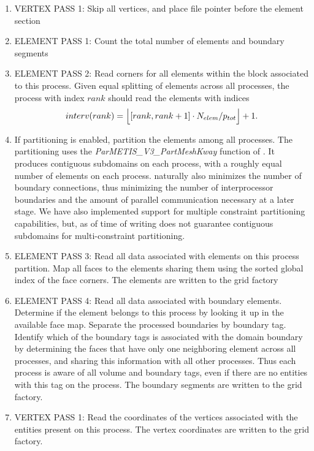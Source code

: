\begin{mybox}
\begin{enumerate}
  \item VERTEX PASS 1: Skip all vertices, and place file pointer before the element section

  \item ELEMENT PASS 1: Count the total number of elements and boundary segments

  \item ELEMENT PASS 2: Read corners for all elements within the block associated to this process. Given equal splitting of elements across all processes, the process with index $rank$ should read the elements with indices \[interv(rank) = \floor[\Big]{ [rank, rank+1] \cdot N_{elem} / p_{tot} } + 1.\]
        
  \item If partitioning is enabled, partition the elements among all processes. The partitioning uses the \textit{ParMETIS\_V3\_PartMeshKway} function of \ParMETIS{} \citeParMetis{}. It produces contiguous subdomains on each process, with a roughly equal number of elements on each process. \ParMETIS{} naturally also minimizes the number of boundary connections, thus minimizing the number of interprocessor boundaries and the amount of parallel communication necessary at a later stage. We have also implemented support for \ParMETIS{} multiple constraint partitioning capabilities, but, as of time of writing \ParMETIS{} does not guarantee contiguous subdomains for multi-constraint partitioning.
        
  \item ELEMENT PASS 3: Read all data associated with elements on this process partition. Map all faces to the elements sharing them using the sorted global index of the face corners. The elements are written to the grid factory
       
  \item ELEMENT PASS 4: Read all data associated with boundary elements. Determine if the element belongs to this process by looking it up in the available face map. Separate the processed boundaries by boundary tag. Identify which of the boundary tags is associated with the domain boundary by determining the faces that have only one neighboring element across all processes, and sharing this information with all other processes. Thus each process is aware of all volume and boundary tags, even if there are no entities with this tag on the process. The boundary segments are written to the grid factory.

  \item VERTEX PASS 1: Read the coordinates of the vertices associated with the entities present on this process. The vertex coordinates are written to the grid factory.
\end{enumerate}
\end{mybox}

